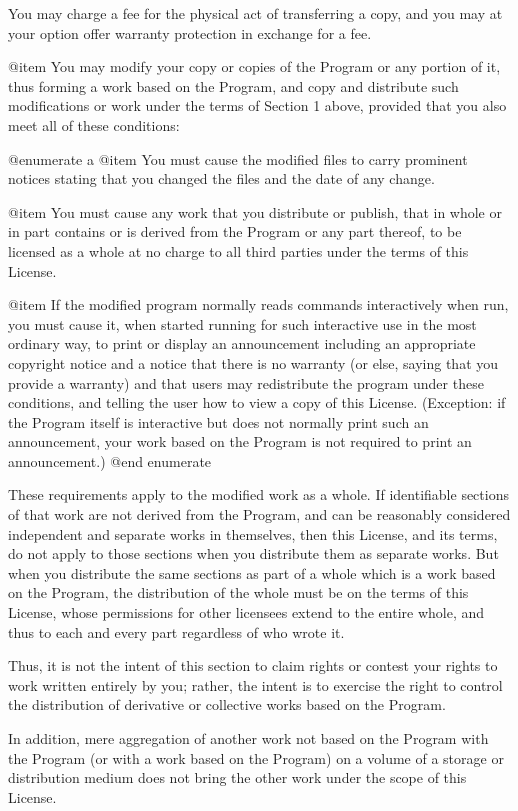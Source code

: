 You may charge a fee for the physical act of transferring a copy, and
you may at your option offer warranty protection in exchange for a fee.

@item
You may modify your copy or copies of the Program or any portion
of it, thus forming a work based on the Program, and copy and
distribute such modifications or work under the terms of Section 1
above, provided that you also meet all of these conditions:

@enumerate a
@item
You must cause the modified files to carry prominent notices
stating that you changed the files and the date of any change.

@item
You must cause any work that you distribute or publish, that in
whole or in part contains or is derived from the Program or any
part thereof, to be licensed as a whole at no charge to all third
parties under the terms of this License.

@item
If the modified program normally reads commands interactively
when run, you must cause it, when started running for such
interactive use in the most ordinary way, to print or display an
announcement including an appropriate copyright notice and a
notice that there is no warranty (or else, saying that you provide
a warranty) and that users may redistribute the program under
these conditions, and telling the user how to view a copy of this
License.  (Exception: if the Program itself is interactive but
does not normally print such an announcement, your work based on
the Program is not required to print an announcement.)
@end enumerate

These requirements apply to the modified work as a whole.  If
identifiable sections of that work are not derived from the Program,
and can be reasonably considered independent and separate works in
themselves, then this License, and its terms, do not apply to those
sections when you distribute them as separate works.  But when you
distribute the same sections as part of a whole which is a work based
on the Program, the distribution of the whole must be on the terms of
this License, whose permissions for other licensees extend to the
entire whole, and thus to each and every part regardless of who wrote it.

Thus, it is not the intent of this section to claim rights or contest
your rights to work written entirely by you; rather, the intent is to
exercise the right to control the distribution of derivative or
collective works based on the Program.

In addition, mere aggregation of another work not based on the Program
with the Program (or with a work based on the Program) on a volume of
a storage or distribution medium does not bring the other work under
the scope of this License.

